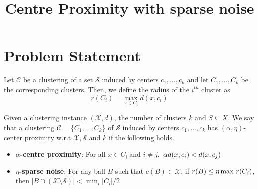 \documentclass[11pt]{article}
\title{\LARGE Centre Proximity with sparse noise}
\author{}
\newcommand{\mc}{\mathcal}
\begin{document}
\maketitle

\section{Problem Statement}
\begin{definition}
Let $\mc C$ be a clustering of a set $\mc S$ induced by centers $c_1,\ldots, c_k$ and let $C_1, \ldots, C_k$ be the corresponding clusters. Then, we define the radius of the $i^{th}$ cluster as
$$r(C_i) = \max_{x \in C_i} d(x, c_i)$$
\end{definition}



\begin{definition}
Given a clustering instance $(\mc X, d)$, the number of clusters $k$ and $S \subseteq X$. We say that a clustering $\mc C = \{C_1, \ldots, C_k\}$ of $\mc S$ induced by centers $c_1, \ldots, c_k$ has $(\alpha, \eta)$-center proximity w.r.t $\mc X, \mc S$ and $k$ if the following holds. 
\begin{itemize}[nolistsep, noitemsep]
\item {\bf $\alpha$-centre proximity}: For all $x \in C_i$ and $i\neq j$, $\thinspace\alpha d(x, c_i) < d(x, c_j)$
\item{\bf $\eta$-sparse noise}: For any ball $B$ such that $c(B)\in \mathcal{X}$, if $r(B)\leq \eta\max \thinspace r(C_i)$, then $|B\cap (\mc X\setminus \mc S)| < \min_i |C_i|/2$
\end{itemize}
\label{defn:alphacpnoise}
\end{definition}
\end{document}
